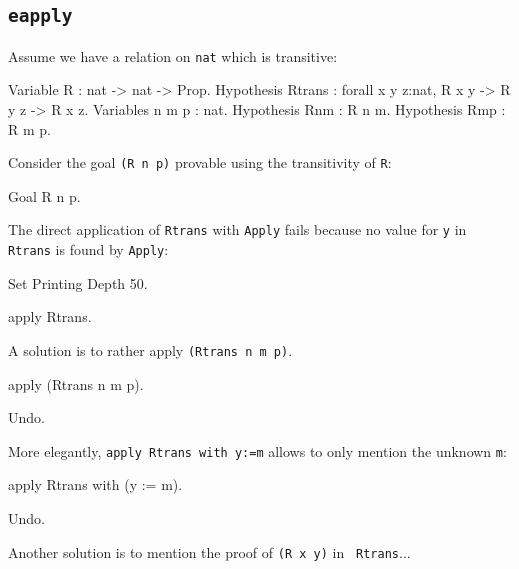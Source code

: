 \begin{coq_example*}
\section{\tt eapply}
\label{eapply-example}
\Example
Assume we have a relation on {\tt nat} which is transitive:

\begin{coq_example*}
Variable R : nat -> nat -> Prop.
Hypothesis Rtrans : forall x y z:nat, R x y -> R y z -> R x z.
Variables n m p : nat.
Hypothesis Rnm : R n m.
Hypothesis Rmp : R m p.
\end{coq_example*}

Consider the goal {\tt (R n p)} provable using the transitivity of
{\tt R}:

\begin{coq_example*}
Goal R n p.
\end{coq_example*}

The direct application of {\tt Rtrans} with {\tt Apply} fails because
no value for {\tt y} in {\tt Rtrans} is found by {\tt Apply}:

\begin{coq_eval}
Set Printing Depth 50.
\end{coq_eval}
\begin{coq_example}
apply Rtrans.
\end{coq_example}

A solution is to rather apply {\tt (Rtrans n m p)}.

\begin{coq_example}
apply (Rtrans n m p).
\end{coq_example}

\begin{coq_eval}
Undo.
\end{coq_eval}

More elegantly, {\tt apply Rtrans with y:=m} allows to only mention
the unknown {\tt m}:

\begin{coq_example}

  apply Rtrans with (y := m).
\end{coq_example}

\begin{coq_eval}
Undo.
\end{coq_eval}

Another solution is to mention the proof of {\tt (R x y)} in {\tt
Rtrans}...


\end{coq_example*}
